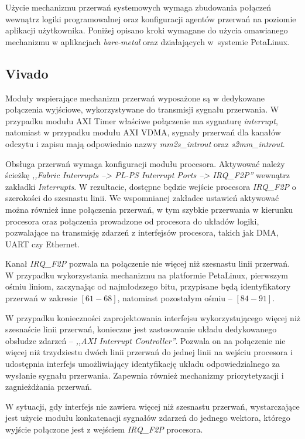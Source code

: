Użycie mechanizmu przerwań systemowych wymaga zbudowania połączeń wewnątrz logiki programowalnej oraz konfiguracji agentów przerwań na poziomie aplikacji użytkownika. 
Poniżej opisano kroki wymagane do użycia omawianego mechanizmu w aplikacjach \textit{bare-metal} oraz działających w~systemie PetaLinux.

\subsection{Vivado}
Moduły wspierające mechanizm przerwań wyposażone są w dedykowane połączenia wyjściowe, wykorzystywane do transmisji sygnału przerwania. 
W przypadku modułu AXI Timer właściwe połączenie ma sygnaturę \emph{interrupt}, natomiast w przypadku modułu AXI VDMA, sygnały przerwań dla kanałów odczytu i zapisu mają odpowiednio nazwy \emph{mm2s\_introut} oraz \emph{s2mm\_introut}.

Obsługa przerwań wymaga konfiguracji modułu procesora. 
Aktywować należy ścieżkę \emph{,,Fabric Interrupts --> PL-PS Interrupt Ports --> IRQ\_F2P''} wewnątrz zakładki \emph{Interrupts}. 
W rezultacie, dostępne będzie wejście procesora \emph{IRQ\_F2P} o szerokości do szesnastu linii. 
We wspomnianej zakładce ustawień aktywować można również inne połączenia przerwań, w tym szybkie przerwania w kierunku procesora oraz połączenia prowadzone od procesora do układów logiki, pozwalające na transmisję zdarzeń z interfejsów procesora, takich jak DMA, UART czy Ethernet.

Kanał \emph{IRQ\_F2P} pozwala na połączenie nie więcej niż szesnastu linii przerwań. 
W przypadku wykorzystania mechanizmu na platformie PetaLinux, pierwszym ośmiu liniom, zaczynając od najmłodszego bitu, przypisane będą identyfikatory przerwań w zakresie $[61-68]$, natomiast pozostałym ośmiu -- $[84-91]$.

W przypadku konieczności zaprojektowania interfejsu wykorzystującego więcej niż szesnaście linii przerwań, konieczne jest zastosowanie układu dedykowanego obsłudze zdarzeń -- \emph{,,AXI Interrupt Controller''}. 
Pozwala on na połączenie nie więcej niż trzydziestu dwóch linii przerwań do jednej linii na wejściu procesora i udostępnia interfejs umożliwiający identyfikację układu odpowiedzialnego za wysłanie sygnału przerwania. 
Zapewnia również mechanizmy priorytetyzacji i zagnieżdżania przerwań.

W sytuacji, gdy interfejs nie zawiera więcej niż szesnastu przerwań, wystarczające jest użycie modułu konkatenacji sygnałów zdarzeń do jednego wektora, którego wyjście połączone jest z wejściem \emph{IRQ\_F2P} procesora.

